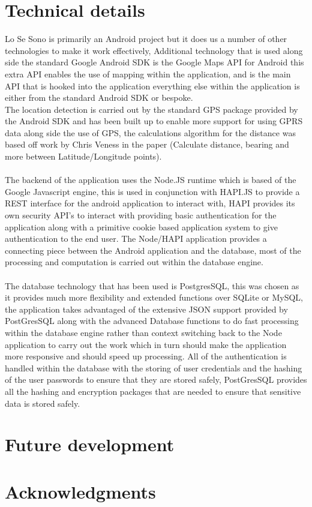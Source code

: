 \documentclass[a0,landscape]{a0poster}
\begin{document}
\begin{multicols}{4}
\section{Technical details}

Lo Se Sono is primarily an Android project but it does us a number of other technologies to make it work effectively, Additional technology that is used along side the standard Google Android SDK is the Google Maps API for Android this extra API enables the use of mapping within the application, and is the main API that is hooked into the application everything else within the application is either from the standard Android SDK or bespoke.\\ The location detection is carried out by the standard GPS package provided by the Android SDK and has been built up to enable more support for using GPRS data along side the use of GPS, the calculations algorithm for the distance was based off work by Chris Veness in the paper (Calculate distance, bearing and more between Latitude/Longitude points).\\
\\
The backend of the application uses the Node.JS runtime which is based of the Google Javascript engine, this is used in conjunction with HAPI.JS to provide a REST interface for the android application to interact with, HAPI provides its own security API's to interact with providing basic authentication for the application along with a primitive cookie based application system to give authentication to the end user. The Node/HAPI application provides a connecting piece between the Android application and the database, most of the processing and computation is carried out within the database engine.\\
\\
The database technology that has been used is PostgresSQL, this was chosen as it provides much more flexibility and extended functions over SQLite or MySQL, the application takes advantaged of the extensive JSON support provided by PostGresSQL along with the advanced Database functions to do fast processing within the database engine rather than context switching back to the Node application to carry out the work which in turn should make the application more responsive and should speed up processing. All of the authentication is handled within the database with the storing of user credentials and the hashing of the user passwords to ensure that they are stored safely, PostGresSQL provides all the hashing and encryption packages that are needed to ensure that sensitive data is stored safely.

\section{Future development}

\section{Acknowledgments}


\end{multicols}
\end{document}
